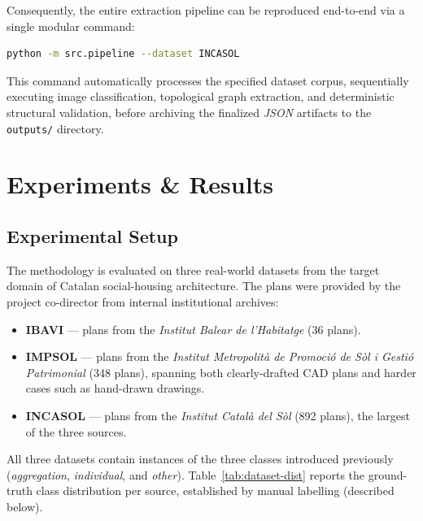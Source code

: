 \documentclass[12pt,a4paper,openright]{report}
\begin{document}
Consequently, the entire extraction pipeline can be reproduced end-to-end via a single modular command:

\begin{lstlisting}[language=bash]
python -m src.pipeline --dataset INCASOL
\end{lstlisting}

\noindent This command automatically processes the specified dataset corpus, sequentially executing image classification, topological graph extraction, and deterministic structural validation, before archiving the finalized \textit{JSON} artifacts to the \texttt{outputs/} directory.


\chapter{Experiments \& Results}
\label{ch:experiments}

\section{Experimental Setup}
\label{sec:exp-setup}

The methodology is evaluated on three real-world datasets from the target domain of Catalan social-housing architecture. The plans were provided by the project co-director from internal institutional archives:

\begin{itemize}
    \item \textbf{IBAVI} --- plans from the \textit{Institut Balear de
    l'Habitatge} (36 plans).
    \item \textbf{IMPSOL} --- plans from the \textit{Institut Metropolità de
    Promoció de Sòl i Gestió Patrimonial} (348 plans), spanning both
    clearly-drafted CAD plans and harder cases such as hand-drawn drawings.
    \item \textbf{INCASOL} --- plans from the \textit{Institut Català del Sòl}
    (892 plans), the largest of the three sources.
\end{itemize}

All three datasets contain instances of the three classes introduced
previously (\textit{aggregation}, \textit{individual}, and \textit{other}). Table~\ref{tab:dataset-dist} reports the ground-truth class distribution per source, established by manual labelling (described below).
\end{document}

